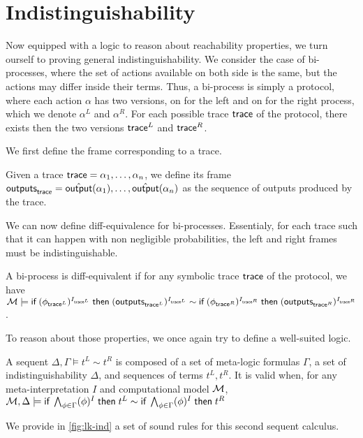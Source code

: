 \section{Indistinguishability}

Now equipped with a logic to reason about reachability properties, we turn ourself to proving general indistinguishability. We consider the case of bi-processes, where the set of actions available on both side is the same, but the actions may differ inside their terms. Thus, a bi-process is simply a protocol, where each action $\alpha$ has two versions, on for the left and on for the right process, which we denote $\alpha^L$ and $\alpha^R$. For each possible trace $\textsf{trace}$ of the protocol, there exists then the two versions $\textsf{trace}^L$ and $\textsf{trace}^R$.


We first define the frame corresponding to a trace.
\begin{definition}
  Given a trace $\textsf{trace} = \alpha_1,\dots,\alpha_n$, we define its frame $\textsf{outputs}_{\textsf{trace}} = \hat{\textsf{output}}(\alpha_1),\dots,\hat{\textsf{output}}(\alpha_n)$ as  the sequence of outputs produced by the trace.
\end{definition}

We can now define diff-equivalence for bi-processes. Essentialy, for each trace such that it can happen with non negligible probabilities, the left and right frames must be indistinguishable.

\begin{definition}
  A bi-process is diff-equivalent if for any symbolic trace $\textsf{trace}$ of the protocol,
  we have $\mathcal{M} \models \textsf{if}\; (\phi_{\textsf{trace}^L})^{I_{\textsf{trace}^L}} \;\textsf{then}\; (\textsf{outputs}_{\textsf{trace}^L})^{I_{\textsf{trace}^L}} \sim   \textsf{if}\; (\phi_{\textsf{trace}^R})^{I_{\textsf{trace}^R}} \;\textsf{then}\; (\textsf{outputs}_{\textsf{trace}^R})^{I_{\textsf{trace}^R}} $.
\end{definition}

To reason about those properties, we once again try to define a well-suited logic.
\begin{definition}
  A sequent $\Delta, \Gamma \vDash t^L \sim t^R $ is composed of a set of meta-logic formulas
  $\Gamma$, a set of indistinguishability $\Delta$, and sequences of terms $t^L,t^R$.
  It is valid when, for any meta-interpretation $I$ and computational model $\mathcal{M}$, $\mathcal{M}, \Delta \models \textsf{if}\; \bigwedge_{\phi \in \Gamma} (\phi)^I \;\textsf{then}\; t^L \sim  \textsf{if}\; \bigwedge_{\phi \in \Gamma} (\phi)^I \;\textsf{then}\; t^R $
\end{definition}


We provide in \cref{fig:lk-ind} a set of sound rules for this second sequent calculus.

